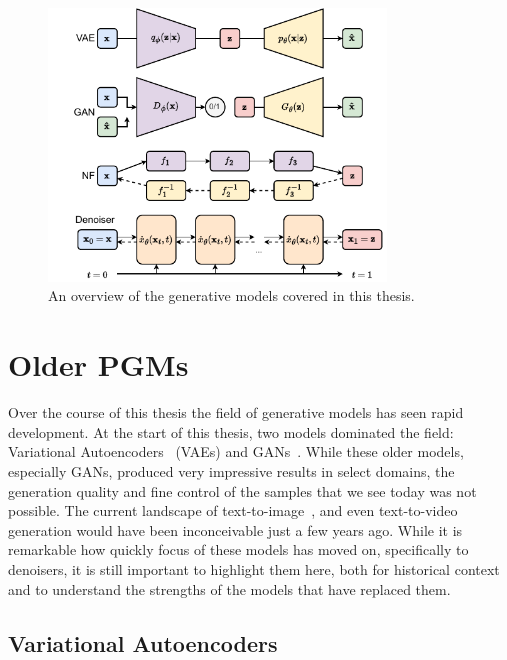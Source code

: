 \begin{figure}[ht]
    \centering
    \includegraphics[width=0.8\textwidth]{Figures/transformers/pgms.pdf}
    \caption{An overview of the generative models covered in this thesis.}
    \label{fig:generative_models}
\end{figure}


\section{Older PGMs}

Over the course of this thesis the field of generative models has seen rapid development.
At the start of this thesis, two models dominated the field: Variational Autoencoders~\cite{AutoEncodingVariationalBayes} (VAEs) and GANs~\cite{GenerativeAdversarialNetworks}.
While these older models, especially GANs, produced very impressive results in select domains, the generation quality and fine control of the samples that we see today was not possible.
The current landscape of text-to-image~\cite{Imagen, Dalle, SD3}, and even text-to-video~\cite{ImagenVideo} generation would have been inconceivable just a few years ago.
While it is remarkable how quickly focus of these models has moved on, specifically to denoisers, it is still important to highlight them here, both for historical context and to understand the strengths of the models that have replaced them.

\subsection{Variational Autoencoders}

